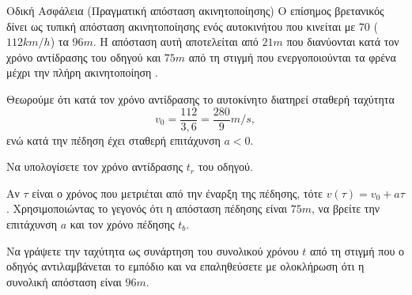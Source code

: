 \begin{problhma}{Οδική Ασφάλεια (Πραγματική απόσταση ακινητοποίησης)}
Ο επίσημος βρετανικός  δίνει ως τυπική απόσταση
ακινητοποίησης ενός αυτοκινήτου που κινείται με $70$ 
($112\si{km/h}$) τα $96\si{m}$. Η απόσταση αυτή αποτελείται από
$21\si{m}$ που διανύονται κατά τον χρόνο αντίδρασης του οδηγού και
$75\si{m}$ από τη στιγμή που ενεργοποιούνται τα φρένα μέχρι την πλήρη
ακινητοποίηση \cite{ukHighwayCodeStoppingDistances}.

Θεωρούμε ότι κατά τον χρόνο αντίδρασης το αυτοκίνητο διατηρεί σταθερή
ταχύτητα
\[
  v_0=\frac{112}{3{,}6}=\frac{280}{9}\si{m/s},
\]
ενώ κατά την πέδηση έχει σταθερή επιτάχυνση $a<0$.

\begin{alist}
\item Να υπολογίσετε τον χρόνο αντίδρασης $t_r$ του οδηγού.
\item Αν $\tau$ είναι ο χρόνος που μετριέται από την έναρξη της πέδησης,
      τότε $v(\tau)=v_0+a\tau$. Χρησιμοποιώντας το γεγονός ότι η
      απόσταση πέδησης είναι $75\si{m}$, να βρείτε την επιτάχυνση $a$
      και τον χρόνο πέδησης $t_b$.
\item Να γράψετε την ταχύτητα ως συνάρτηση του συνολικού χρόνου $t$ από
      τη στιγμή που ο οδηγός αντιλαμβάνεται το εμπόδιο και να
      επαληθεύσετε με ολοκλήρωση ότι η συνολική απόσταση είναι
      $96\si{m}$.
\end{alist}

\begin{center}
\end{center}
\end{problhma}
